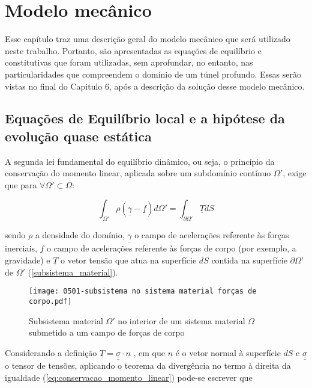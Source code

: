 \chapter{Modelo mecânico}

Esse capítulo traz uma descrição geral do modelo mecânico que será utilizado neste trabalho. Portanto, são apresentadas as equações de equilíbrio e constitutivas que foram utilizadas, sem aprofundar, no entanto, nas particularidades que compreendem o domínio de um túnel profundo. Essas serão vistas no final do Capitulo 6, após a descrição da solução desse modelo mecânico. 

\section{Equações de Equilíbrio local e a hipótese da evolução quase estática}

A segunda lei fundamental do equilíbrio dinâmico, ou seja, o princípio da conservação do momento linear, aplicada sobre um subdomínio contínuo $\Omega'$, exige que para $\forall \Omega' \subset \Omega$:

\begin{equation}
	\label{eq:conservacao_momento_linear}
\int_{\Omega'}\rho(\underline\gamma-\underline f)d\Omega' = \int_{\partial\Omega'}\underline T dS
\end{equation}

sendo $\rho$ a densidade do domínio, $\underline\gamma$ o campo de acelerações referente às forças inerciais, $\underline f$ o campo de acelerações referente às forças de corpo (por exemplo, a gravidade) e $\underline T$ o vetor tensão que atua na superfície $dS$ contida na superfície $\partial\Omega'$ de $\Omega'$ (\autoref{subsistema_material}).
%
\begin{figure}[H]
	\begin{center}
		\texttt{[image: 0501-subsistema no sistema material forças de corpo.pdf]}
	\end{center}
	\caption{\label{subsistema_material}Subsistema material $\Omega'$ no interior de um sistema material $\Omega$ submetido a um campo de forças de corpo}
\end{figure}

Considerando a definição $\underline T = \underline{\underline\sigma}\cdot \underline n$ , em que $\underline n$ é o vetor normal à superfície $dS$ e $\underline{\underline\sigma}$ o tensor de tensões, aplicando o teorema da divergência no termo à direita da igualdade (\ref{eq:conservacao_momento_linear}) pode-se escrever que

